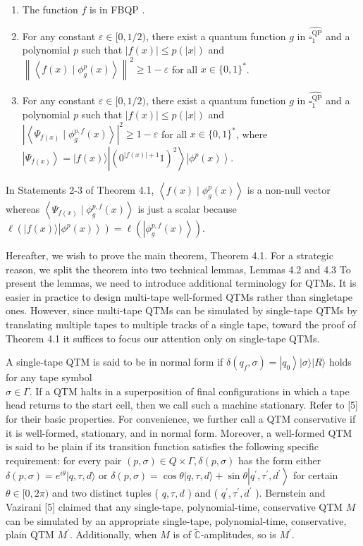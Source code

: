 \documentclass[10pt]{article}
\begin{document}
\begin{enumerate}
  \item The function $f$ is in FBQP .
  \item For any constant $\varepsilon \in[0,1 / 2)$, there exist a quantum function $g$ in $\widehat{\square_{1}^{\mathrm{QP}}}$ and a polynomial $p$ such that $|f(x)| \leq p(|x|)$ and $\left\|\left\langle f(x) \mid \phi_{g}^{p}(x)\right\rangle\right\|^{2} \geq 1-\varepsilon$ for all $x \in\{0,1\}^{*}$.
  \item For any constant $\varepsilon \in[0,1 / 2)$, there exist a quantum function $g$ in $\widehat{\square_{1}^{\mathrm{QP}}}$ and a polynomial $p$ such that $|f(x)| \leq p(|x|)$ and $\left|\left\langle\Psi_{f(x)} \mid \phi_{g}^{p, f}(x)\right\rangle\right|^{2} \geq 1-\varepsilon$ for all $x \in\{0,1\}^{*}$, where $\left|\Psi_{f(x)}\right\rangle= |f(x)\rangle\left|\left(0^{|f(x)|+1} 1\right)^{2}\right\rangle\left|\phi^{p}(x)\right\rangle$.
\end{enumerate}

In Statements 2-3 of Theorem 4.1, $\left\langle f(x) \mid \phi_{g}^{p}(x)\right\rangle$ is a non-null vector whereas $\left\langle\Psi_{f(x)} \mid \phi_{g}^{p, f}(x)\right\rangle$ is just a scalar because $\ell\left(|f(x)\rangle\left|\phi^{p}(x)\right\rangle\right)=\ell\left(\left|\phi_{g}^{p, f}(x)\right\rangle\right)$.

Hereafter, we wish to prove the main theorem, Theorem 4.1. For a strategic reason, we split the theorem into two technical lemmas, Lemmas 4.2 and 4.3 To present the lemmas, we need to introduce additional terminology for QTMs. It is easier in practice to design multi-tape well-formed QTMs rather than singletape ones. However, since multi-tape QTMs can be simulated by single-tape QTMs by translating multiple tapes to multiple tracks of a single tape, toward the proof of Theorem 4.1 it suffices to focus our attention only on single-tape QTMs.

A single-tape QTM is said to be in normal form if $\delta\left(q_{f}, \sigma\right)=\left|q_{0}\right\rangle|\sigma\rangle|R\rangle$ holds for any tape symbol\\
$\sigma \in \Gamma$. If a QTM halts in a superposition of final configurations in which a tape head returns to the start cell, then we call such a machine stationary. Refer to [5] for their basic properties. For convenience, we further call a QTM conservative if it is well-formed, stationary, and in normal form. Moreover, a well-formed QTM is said to be plain if its transition function satisfies the following specific requirement: for every pair $(p, \sigma) \in Q \times \Gamma, \delta(p, \sigma)$ has the form either $\delta(p, \sigma)=e^{i \theta}|q, \tau, d\rangle$ or $\delta(p, \sigma)=\cos \theta|q, \tau, d\rangle+\sin \theta\left|q^{\prime}, \tau^{\prime}, d^{\prime}\right\rangle$ for certain $\theta \in[0,2 \pi)$ and two distinct tuples ( $q, \tau, d$ ) and ( $q^{\prime}, \tau^{\prime}, d^{\prime}$ ). Bernstein and Vazirani [5] claimed that any single-tape, polynomial-time, conservative QTM $M$ can be simulated by an appropriate single-tape, polynomial-time, conservative, plain QTM $M^{\prime}$. Additionally, when $M$ is of $\tilde{\mathbb{C}}$-amplitudes, so is $M^{\prime}$.
\end{document}
